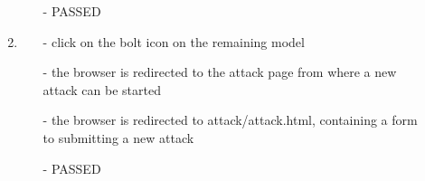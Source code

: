 \begin{description}
\begin{enumerate}
\begin{itemize}
			\item [-] PASSED
		\end{itemize}
		\item
		\begin{itemize}
			\item [-] click on the bolt icon on the remaining model
			\item [-] the browser is redirected to the attack page from where a new attack can be started
			\item [-] the browser is redirected to attack/attack.html, containing a form to submitting a new attack
			\item [-] PASSED
		\end{itemize}
	\end{enumerate}
\end{description}


